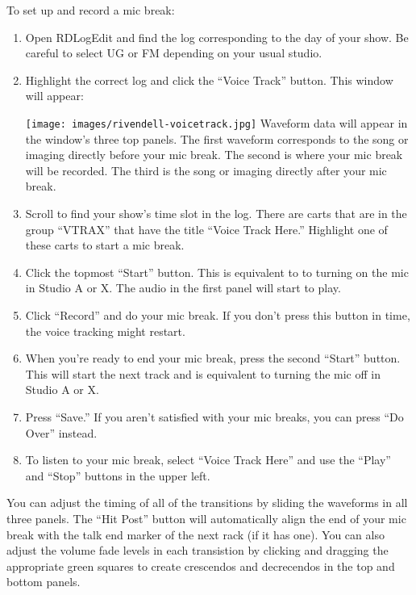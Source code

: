 \documentclass{witrman}
\begin{document}
To set up and record a mic break:
\begin{enumerate}
    \item Open RDLogEdit and find the log corresponding to the day of your show.
        Be careful to select UG or FM depending on your usual studio.
    \item Highlight the correct log and click the ``Voice Track'' button.  This
        window will appear:

        \texttt{[image: images/rivendell-voicetrack.jpg]}
        Waveform data will appear in the window's three top panels.  The first
        waveform corresponds to the song or imaging directly before your mic
        break.  The second is where your mic break will be recorded.  The third
        is the song or imaging directly after your mic break.
    \item Scroll to find your show's time slot in the log.  There are carts that
        are in the group ``VTRAX'' that have the title ``Voice Track Here.''
        Highlight one of these carts to start a mic break.
    \item Click the topmost ``Start'' button.  This is equivalent to to turning
        on the mic in Studio A or X.  The audio in the first panel will start to
        play.
    \item Click ``Record'' and do your mic break.  If you don't press this
        button in time, the voice tracking might restart.
    \item When you're ready to end your mic break, press the second ``Start''
        button.  This will start the next track and is equivalent to turning the
        mic off in Studio A or X.
    \item Press ``Save.'' If you aren't satisfied with your mic breaks, you can
        press ``Do Over'' instead.
    \item To listen to your mic break, select ``Voice Track Here'' and use the
        ``Play'' and ``Stop'' buttons in the upper left.
\end{enumerate}

You can adjust the timing of all of the transitions by sliding the waveforms in
all three panels.  The ``Hit Post'' button will automatically align the end of
your mic break with the talk end marker of the next rack (if it has one).  You
can also adjust the volume fade levels in each transistion by clicking and
dragging the appropriate green squares to create crescendos and decrecendos in
the top and bottom panels.
\end{document}
